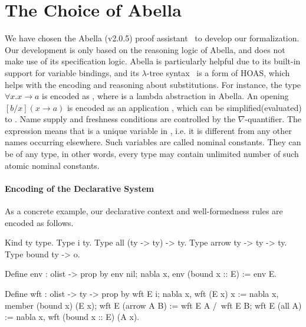 \section{The Choice of Abella}

We have chosen the Abella (v2.0.5) proof assistant~\cite{AbellaDesc} to
develop our formalization.
Our development is only based on the reasoning logic of Abella, and does not make use of its specification logic.
Abella is particularly helpful due to its built-in support for variable bindings, and
its $\lambda$-tree syntax~\cite{miller2000abstract} is a form of HOAS,
which helps with the encoding and reasoning about substitutions.  For
instance, the type $\forall x. x \to a$ is encoded as , where  is a lambda abstraction in
Abella. An opening $[b/x](x\to a)$ is encoded as an application
, which can be simplified(evaluated) to
.
Name supply and freshness conditions are controlled by the
$\nabla$-quantifier.  The expression  means that
 is a unique variable in , i.e. it is different
from any other names occurring elsewhere.  Such variables are called
nominal constants.  They can be of any type, in other words, every
type may contain unlimited number of such atomic nominal constants.


\paragraph{Encoding of the Declarative System}
As a concrete example, our declarative context and well-formedness rules are encoded as follows.
\begin{abella}
	Kind ty     type.
	Type i      ty.                %
	Type all    (ty -> ty) -> ty.    %
	Type arrow  ty -> ty -> ty.      %
	Type bound  ty -> o.            %
	
	Define env : olist -> prop by
		env nil;
		nabla x, env (bound x :: E) := env E.
	
	Define wft : olist -> ty -> prop by
		wft E i;
		nabla x, wft (E x) x := nabla x, member (bound x) (E x);
		wft E (arrow A B) := wft E A /\ wft E B;
		wft E (all A) := nabla x, wft (bound x :: E) (A x).
\end{abella}

